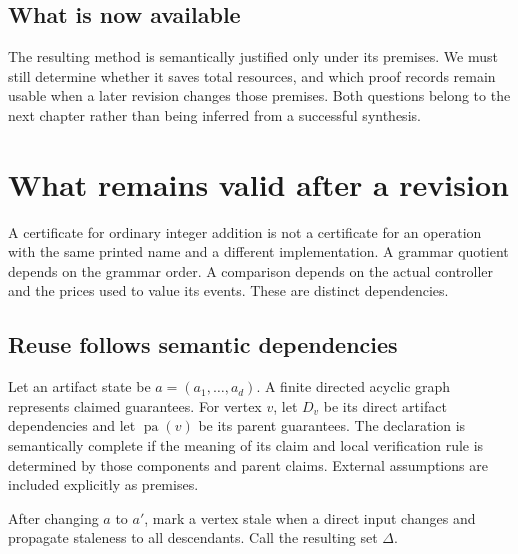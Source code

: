 \section*{What is now available}
The resulting method is semantically justified only under its premises. We must still determine whether it saves total resources, and which proof records remain usable when a later revision changes those premises. Both questions belong to the next chapter rather than being inferred from a successful synthesis.

\chapter{What remains valid after a revision}\label{ch:revision}
A certificate for ordinary integer addition is not a certificate for an operation with the same printed name and a different implementation. A grammar quotient depends on the grammar order. A comparison depends on the actual controller and the prices used to value its events. These are distinct dependencies.

\section{Reuse follows semantic dependencies}
Let an artifact state be $a=(a_1,\ldots,a_d)$. A finite directed acyclic graph represents claimed guarantees. For vertex $v$, let $D_v$ be its direct artifact dependencies and let $\operatorname{pa}(v)$ be its parent guarantees. The declaration is semantically complete if the meaning of its claim and local verification rule is determined by those components and parent claims. External assumptions are included explicitly as premises.

After changing $a$ to $a'$, mark a vertex stale when a direct input changes and propagate staleness to all descendants. Call the resulting set $\Delta$.


